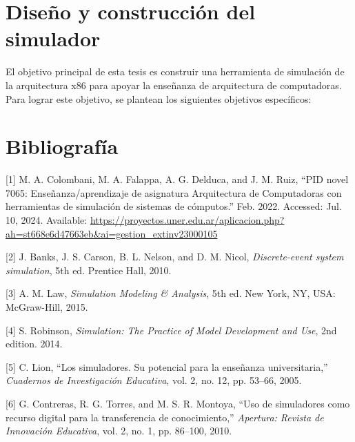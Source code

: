 \documentclass[12pt,twoside]{templates/unerthesis}
\begin{document}
\hypertarget{diseuxf1o-y-construcciuxf3n-del-simulador}{%
\chapter{Diseño y construcción del simulador}\label{diseuxf1o-y-construcciuxf3n-del-simulador}}

El objetivo principal de esta tesis es construir una herramienta de simulación de la arquitectura x86 para apoyar la enseñanza de arquitectura de computadoras. Para lograr este objetivo, se plantean los siguientes objetivos específicos:

\hypertarget{bibliografuxeda}{%
\chapter*{Bibliografía}\label{bibliografuxeda}}

\hypertarget{refs}{}
\leavevmode\hypertarget{ref-colombani_pid_2022}{}%
{[}1{]} M. A. Colombani, M. A. Falappa, A. G. Delduca, and J. M. Ruiz, ``PID novel 7065: Enseñanza/aprendizaje de asignatura Arquitectura de Computadoras con herramientas de simulación de sistemas de cómputos.'' Feb. 2022. Accessed: Jul. 10, 2024. Available: \href{https://proyectos.uner.edu.ar/aplicacion.php?ah=st668e6d47663eb\&ai=gestion_extinv\%7C\%7C23000105}{https://proyectos.uner.edu.ar/aplicacion.php?ah=st668e6d47663eb\&ai=gestion\_extinv\textbar{}\textbar{}23000105}

\leavevmode\hypertarget{ref-banks_discrete-event_2010}{}%
{[}2{]} J. Banks, J. S. Carson, B. L. Nelson, and D. M. Nicol, \emph{Discrete-event system simulation}, 5th ed. Prentice Hall, 2010.

\leavevmode\hypertarget{ref-law_simulation_2015}{}%
{[}3{]} A. M. Law, \emph{Simulation Modeling \& Analysis}, 5th ed. New York, NY, USA: McGraw-Hill, 2015.

\leavevmode\hypertarget{ref-robinson_simulation_2014}{}%
{[}4{]} S. Robinson, \emph{Simulation: The Practice of Model Development and Use}, 2nd edition. 2014.

\leavevmode\hypertarget{ref-lion_simuladores_2005}{}%
{[}5{]} C. Lion, ``Los simuladores. Su potencial para la enseñanza universitaria,'' \emph{Cuadernos de Investigación Educativa}, vol. 2, no. 12, pp. 53--66, 2005.

\leavevmode\hypertarget{ref-contreras_uso_2010}{}%
{[}6{]} G. Contreras, R. G. Torres, and M. S. R. Montoya, ``Uso de simuladores como recurso digital para la transferencia de conocimiento,'' \emph{Apertura: Revista de Innovación Educativa}, vol. 2, no. 1, pp. 86--100, 2010.
\end{document}
